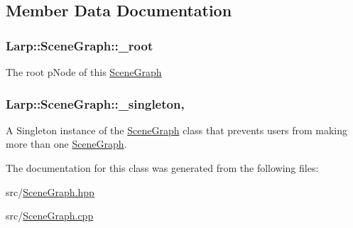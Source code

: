 \subsection{Member Data Documentation}
\hypertarget{classLarp_1_1SceneGraph_a88a58f51a6937827ae1d814d0b44a0d7}{
\subsubsection[{\-\_\-root}]{ Larp\-::\-Scene\-Graph\-::\-\_\-root\hspace{0.3cm}{\ttfamily [private]}}}\label{classLarp_1_1SceneGraph_a88a58f51a6937827ae1d814d0b44a0d7}
The root p\-Node of this \hyperlink{classLarp_1_1SceneGraph}{Scene\-Graph} \hypertarget{classLarp_1_1SceneGraph_a93181088bdc8610fb5d56904b588426f}{
\subsubsection[{\-\_\-singleton}]{ Larp\-::\-Scene\-Graph\-::\-\_\-singleton\hspace{0.3cm}{\ttfamily [static]}, {\ttfamily [private]}}}\label{classLarp_1_1SceneGraph_a93181088bdc8610fb5d56904b588426f}
A Singleton instance of the \hyperlink{classLarp_1_1SceneGraph}{Scene\-Graph} class that prevents users from making more than one \hyperlink{classLarp_1_1SceneGraph}{Scene\-Graph}. 

The documentation for this class was generated from the following files\-:\begin{DoxyCompactItemize}
\item 
src/\hyperlink{SceneGraph_8hpp}{Scene\-Graph.\-hpp}\item 
src/\hyperlink{SceneGraph_8cpp}{Scene\-Graph.\-cpp}\end{DoxyCompactItemize}
